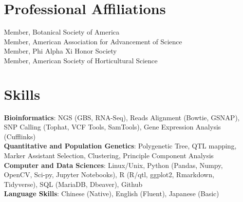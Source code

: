 \documentclass[11pt,a4paper,]{awesome-cv}
\begin{document}
\hypertarget{professional-affiliations}{%
\section{Professional Affiliations}\label{professional-affiliations}}

Member, Botanical Society of America\\
Member, American Association for Advancement of Science\\
Member, Phi Alpha Xi Honor Society\\
Member, American Society of Horticultural Science

\hypertarget{skills}{%
\section{Skills}\label{skills}}

\textbf{Bioinformatics}: NGS (GBS, RNA-Seq), Reads Alignment (Bowtie,
GSNAP), SNP Calling (Tophat, VCF Tools, SamTools), Gene Expression
Analysis (Cufflinks)\\
\textbf{Quantitative and Population Genetics}: Polygenetic Tree, QTL
mapping, Marker Assistant Selection, Clustering, Principle Component
Analysis\\
\textbf{Computer and Data Sciences}: Linux/Unix, Python (Pandas, Numpy,
OpenCV, Sci-py, Jupyter Notebooks), R (R/qtl, ggplot2, Rmarkdown,
Tidyverse), SQL (MariaDB, Dbeaver), Github\\
\textbf{Language Skills}: Chinese (Native), English (Fluent), Japanese
(Basic)
\end{document}
